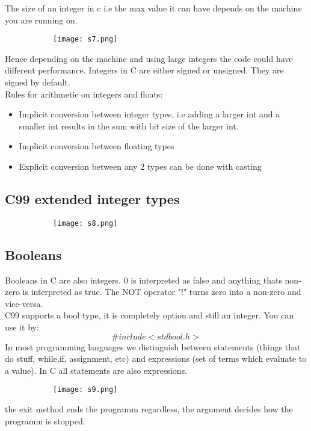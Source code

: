 \documentclass[8pt]{extreport}
\begin{document}
The size of an integer in c i.e the max value it can have depends on the machine you are running on.
\begin{figure}[H]
\centering
\begin{subfigure}[b]{0.4\linewidth}
\texttt{[image: s7.png]}
\end{subfigure}
\end{figure}
Hence depending on the machine and using large integers the code could have different performance.
Integers in C are either signed or unsigned. They are signed by default. \\
Rules for arithmetic on integers and floats:
\begin{itemize}
\item Implicit conversion between integer types, i.e adding a larger int and a smaller int results in the sum with bit size of the larger int.
\item Implicit conversion between floating types
\item Explicit conversion between any 2 types can be done with casting
\end{itemize}
\subsection{C99 extended integer types}
\begin{figure}[H]
\centering
\begin{subfigure}[b]{0.4\linewidth}
\texttt{[image: s8.png]}
\end{subfigure}
\end{figure}

\subsection{Booleans}

Booleans in C are also integers. 0 is interpreted as false and anything thats non-zero is interpreted as true. The NOT operator "!" turns zero into a non-zero and vice-versa.\\
C99 supports a bool type, it is completely option and still an integer. You can use it by:
$$ \#include <stdbool.h> $$
In most programming languages we distinguish between statements (things that do stuff, while,if, assignment, etc) and expressions (set of terms which evaluate to a value). In C all statements are also expressions.
\begin{figure}[H]
\centering
\begin{subfigure}[b]{0.4\linewidth}
\texttt{[image: s9.png]}
\end{subfigure}
\end{figure}
the exit method ends the programm regardless, the argument decides how the programm is stopped.
\end{document}
